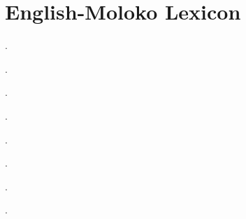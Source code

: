 \chapter{English-Moloko Lexicon}
\begin{styleLetterParagraph}
\end{styleLetterParagraph}

\begin{multicols}{2}
\begin{styleEntryParagraph}

		.
\end{styleEntryParagraph}

\begin{styleEntryParagraph}

		.
\end{styleEntryParagraph}


\begin{styleEntryParagraph}

		.
\end{styleEntryParagraph}

\begin{styleEntryParagraph}

		.
\end{styleEntryParagraph}

\begin{styleEntryParagraph}

		.
\end{styleEntryParagraph}

\begin{styleEntryParagraph}

		. 
\end{styleEntryParagraph}

\begin{styleEntryParagraph}

		.
\end{styleEntryParagraph}

\begin{styleEntryParagraph}

		.
\end{styleEntryParagraph}


\end{multicols}
